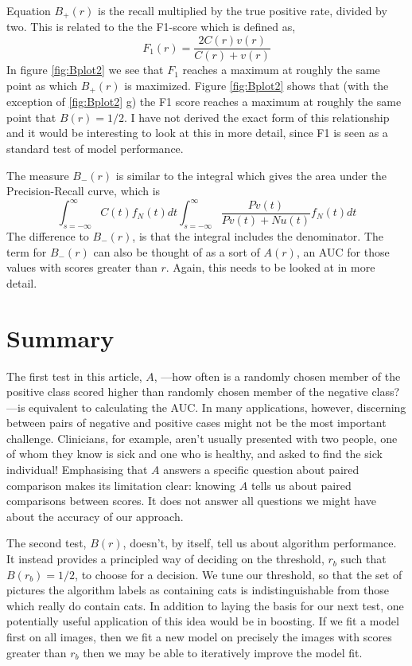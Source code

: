 \documentclass[preprint,12pt]{elsarticle}
\begin{document}
Equation $B_+(r)$ is the recall multiplied by the true positive rate, divided by two. This is related to the the F1-score which is defined as,
\begin{equation}
F_1(r) =  \frac{2 C(r) v(r)}{C(r) + v(r)}   \label{eq:F1}
\end{equation}
In figure \ref{fig:Bplot2} we see that $F_1$ reaches a maximum at roughly the same point as which $B_+(r)$ is maximized.  Figure \ref{fig:Bplot2} shows that (with the exception of \ref{fig:Bplot2} g) the F1 score reaches a maximum at roughly the same point that $B(r)=1/2$. I have not derived the exact form of this relationship and it would be interesting to look at this in more detail, since F1 is seen as a standard test of model performance.

The measure $B_-(r)$ is similar to the integral which gives the area under the Precision-Recall curve, which is
\[
\int_{s=-\infty}^{\infty}  C(t) f_N(t) dt  \int_{s=-\infty}^{\infty}  \frac{P v(t)}{P v(t) + N u(t)} f_N(t) dt 
\]
The difference to $B_-(r)$, is that the integral includes the denominator. The term for $B_-(r)$ can also be thought of as a sort of $A(r)$, an AUC for those values with scores greater than $r$. Again, this needs to be looked at in more detail. 

\section{Summary}

The first test in this article, $A$, ---how often is a randomly chosen member of the positive class scored higher than randomly chosen member of the negative class?---is equivalent to calculating the AUC. In many applications, however, discerning between pairs of negative and positive cases might not be the most important challenge. Clinicians, for example, aren't usually presented with two people, one of whom they know is sick and one who is healthy, and asked to find the sick individual! Emphasising that $A$ answers a specific question about paired comparison makes its limitation clear: knowing $A$ tells us about paired comparisons between scores. It does not answer all questions we might have about the accuracy of our approach.

The second test, $B(r)$, doesn't, by itself, tell us about algorithm performance. It instead provides a principled way of deciding on the threshold, $r_b$ such that $B(r_b)=1/2$, to choose for a decision. We tune our threshold, so that the set of pictures the algorithm labels as containing cats is indistinguishable from those which really do contain cats. In addition to laying the basis for our next test, one potentially useful application of this idea would be in boosting. If we fit a model first on all images, then we fit a new model on precisely the images with scores greater than $r_b$ then we may be able to iteratively improve the model fit.
\end{document}
